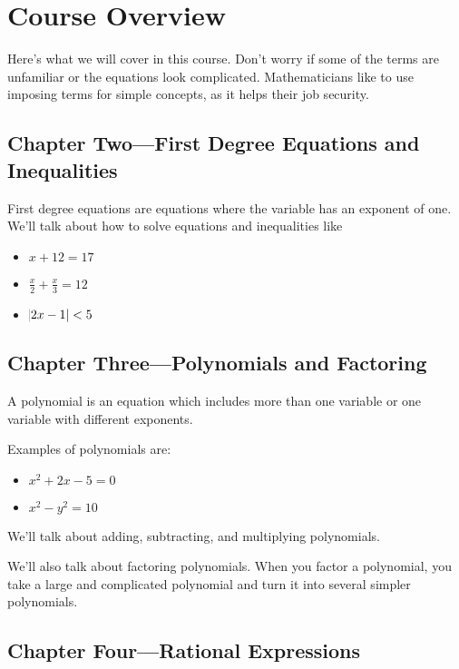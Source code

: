 \documentclass[letterpaper, landscape]{exam}
\begin{document}
    \section{Course Overview}

    Here's what we will cover in this course.  Don't worry if some of the terms are unfamiliar or
    the equations look complicated.  Mathematicians like to use imposing terms for simple concepts,
    as it helps their job security.  

    \subsection{Chapter Two---First Degree Equations and Inequalities}

    First degree equations are equations where the variable has an exponent of one.  We'll talk
    about how to solve equations and inequalities like

    \begin{itemize}
        \item $x + 12 = 17 $
        \item $\frac{x}{2} + \frac{x}{3} = 12$
        \item $\abs{2x - 1} < 5$
    \end{itemize}

    \newpage

    \subsection{Chapter Three---Polynomials and Factoring}

    A polynomial is an equation which includes more than one variable or one variable with different
    exponents.  
    
    Examples of polynomials are:
    \begin{itemize}
        \item $x^2 + 2x -5 = 0$
        \item $x^2 - y^2 = 10 $
    \end{itemize}

    We'll talk about adding, subtracting, and multiplying polynomials.

    We'll also talk about factoring polynomials.  When you factor a polynomial, you take a large and
    complicated polynomial and turn it into several simpler polynomials.  

    \subsection{Chapter Four---Rational Expressions}
\end{document}
